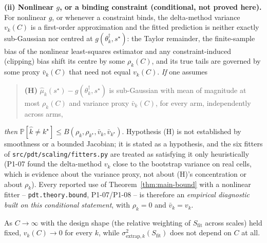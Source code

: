 \begin{theorem}
\textbf{(ii) Nonlinear $g$, or a binding constraint (conditional, not proved here).} For
nonlinear $g$, or whenever a constraint binds, the delta-method variance $v_k(C)$ is a
first-order approximation and the fitted prediction is neither exactly sub-Gaussian nor
centred at $g(\theta_k^{\dagger}, s^\star)$: the Taylor remainder, the finite-sample bias
of the nonlinear least-squares estimator and any constraint-induced (clipping) bias
shift its centre by some $\rho_k(C)$, and its true tails are governed by some proxy
$\bar v_k(C)$ that need not equal $v_k(C)$. \emph{If} one assumes
\begin{quote}
\textbf{(H)} $\hat\mu_k(s^\star) - g(\theta_k^{\dagger}, s^\star)$ is sub-Gaussian with
mean of magnitude at most $\rho_k(C)$ and variance proxy $\bar v_k(C)$, for every arm,
independently across arms,
\end{quote}
\emph{then} $\mathbb{P}[\hat{k} \ne k^\star] \le B(\rho_k, \rho_{k^\star}, \bar v_k,
\bar v_{k^\star})$. Hypothesis (H) is not established by smoothness or a bounded
Jacobian; it is stated as a hypothesis, and the six fitters of
\texttt{src/pdt/scaling/fitters.py} are treated as satisfying it only heuristically
(P1-07 found the delta-method $v_k$ close to the bootstrap variance on real cells, which
is evidence about the variance proxy, not about (H)'s concentration or about $\rho_k$).
Every reported use of Theorem~\ref{thm:main-bound} with a nonlinear fitter --
\texttt{pdt.theory.bound}, P1-07/P1-08 -- is therefore an \emph{empirical diagnostic
built on this conditional statement}, with $\rho_k = 0$ and $\bar v_k = v_k$.

As $C \to \infty$ with the design shape (the relative weighting of $S_{\mathrm{fit}}$
across scales) held fixed, $v_k(C) \to 0$ for every $k$, while
$\sigma^2_{\mathrm{extrap}, k}(S_{\mathrm{fit}})$ does not depend on $C$ at all.
\end{theorem}

